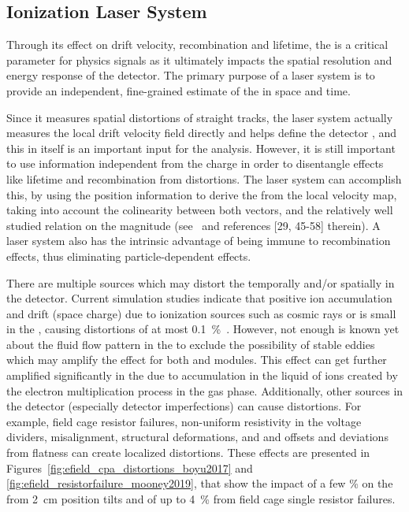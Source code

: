\subsection{Ionization Laser System}
\label{sec:sp-calib-sys-las-ion}
Through its effect on drift velocity, recombination and lifetime, the \efield is a critical parameter for physics signals as it ultimately impacts the spatial resolution and energy response of the detector. The primary purpose of a laser system is to provide an independent, fine-grained estimate of the \efield in space and time. 

Since it measures spatial distortions of straight tracks, the laser system actually measures the local drift velocity field directly and helps define the detector , and this in itself is an important input for the  analysis. 
However, it is still important to use information independent from the charge in order to disentangle effects like lifetime and recombination from \efield distortions. The laser system can accomplish this, by using the position information to derive the \efield from the local velocity map, taking into account the colinearity between both vectors, and the relatively well studied relation on the magnitude (see~\cite{Li:2015rqa} and references [29, 45-58] therein). A laser system also has the intrinsic advantage of being immune to recombination effects, thus eliminating particle-dependent effects.  

There are multiple sources which may distort the \efield temporally  and/or spatially in the detector. Current simulation studies indicate that positive ion accumulation and drift (space charge) due to ionization sources such as cosmic rays or  is small in the  , causing \efield distortions of at most \SI{0.1}{\%}~\cite{bib:mooney2018}.
However, not enough is known yet about the fluid flow pattern in the  to exclude the possibility of stable eddies which may amplify the effect for both \single and \dual modules. This effect can get further amplified significantly in the  due to  accumulation in the liquid of ions created by the electron multiplication process in the gas phase.
Additionally, other sources in the detector (especially detector imperfections) can cause \efield distortions. For example, field cage resistor failures, non-uniform resistivity in the voltage dividers,  misalignment,  structural deformations, and  and  offsets and  deviations from flatness can create localized \efield distortions. These effects are presented in Figures~\ref{fig:efield_cpa_distortions_boyu2017} and \ref{fig:efield_resistorfailure_mooney2019}, that show the impact of a few \% on the \efield from \SI{2}{\cm}  position tilts and of up to \SI{4}{\%} from field cage single resistor failures.

